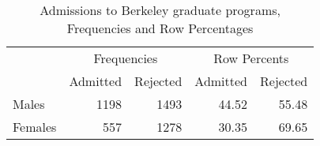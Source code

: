 \begin{table}[htb]
\caption{Admissions to Berkeley graduate programs, Frequencies and Row Percentages}
\label{tab:berkrow}
 \begin{center}
\begin{tabular}{lrr|rr}
\hline
  & \multicolumn{2}{c|}{Frequencies} &\multicolumn{2}{c}{Row Percents} \\
  & Admitted & Rejected & Admitted & Rejected  \\
\hline
 Males  & 1198 & 1493 &  44.52 & 55.48  \\
 Females & 557 & 1278 &  30.35 & 69.65  \\
\hline
\end{tabular}
\end{center}
\end{table}